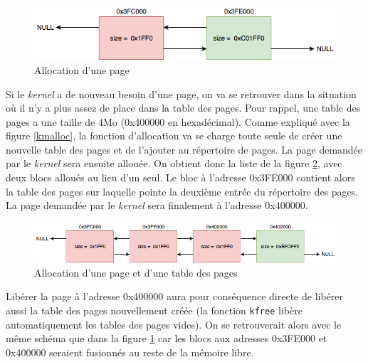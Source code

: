 \begin{figure}[!h]
  \centering
  \includegraphics[scale=0.6]{images/alloc1.png}
  \caption{Allocation d'une page}
  \label{alloc1}
\end{figure}

Si le \textit{kernel} a de nouveau besoin d'une page, on va se retrouver dans la
situation où il n'y a plus assez de place dans la table des pages. Pour rappel,
une table des pages a une taille de 4Mo (0x400000 en hexadécimal). Comme expliqué
avec la figure \ref{kmalloc}, la fonction d'allocation va se charge toute seule
de créer une nouvelle table des pages et de l'ajouter au répertoire de pages.
La page demandée par le \textit{kernel} sera ensuite allouée. On obtient donc
la liste de la figure \ref{alloc2}, avec deux blocs alloués au lieu d'un seul.
Le bloc à l'adresse 0x3FE000 contient alors la table des pages sur laquelle pointe
la deuxième entrée du répertoire des pages. La page demandée par le \textit{kernel}
sera finalement à l'adresse 0x400000.

\begin{figure}[!h]
  \centering
  \includegraphics[scale=0.6]{images/alloc2.png}
  \caption{Allocation d'une page et d'une table des pages}
  \label{alloc2}
\end{figure}

Libérer la page à l'adresse 0x400000 aura pour conséquence directe de libérer aussi
la table des pages nouvellement créée (la fonction \texttt{kfree} libère
automatiquement les tables des pages vides). On se retrouverait alors avec le même
schéma que dans la figure \ref{alloc1} car les blocs aux adresses 0x3FE000 et
0x400000 seraient fusionnés au reste de la mémoire libre.